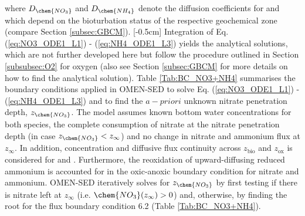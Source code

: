 \documentclass[gmd, manuscript]{copernicus}
\begin{document}
where $D_\chem{NO_3}$ and $D_{\chem{NH_4}}$ denote the diffusion coefficients for  and  which depend on the bioturbation status of the respective geochemical zone (compare Section \ref{subsec:GBCM}). 
[-0.5cm]%
Integration of Eq. (\ref{eq:NO3_ODE1_L1}) - (\ref{eq:NH4_ODE1_L3}) yields the analytical solutions, which are not further developed here but follow the procedure outlined in Section \ref{subsubsec:O2} for oxygen 
(also see Section \ref{subsec:GBCM} for more details on how to find the analytical solution). Table \ref{Tab:BC_NO3+NH4} summarises the boundary conditions applied in OMEN-SED to solve Eq. (\ref{eq:NO3_ODE1_L1}) - (\ref{eq:NH4_ODE1_L3}) 
and to find the $a-priori$ unknown nitrate penetration depth, $z_\chem{NO_3}$. 
The model assumes known bottom water concentrations for both species, the complete consumption of nitrate at the nitrate penetration depth (in case  $z_{\chem{NO_3}} < z_\infty$) and no change in nitrate and ammonium 
flux at $z_\infty$. In addition, concentration and diffusive flux continuity across $z_{\mathrm{bio}}$ and $z_{\mathrm{ox}}$ is considered for  and . 
Furthermore, the reoxidation of upward-diffusing reduced ammonium is accounted for in the oxic-anoxic boundary condition for nitrate and ammonium. 
OMEN-SED iteratively solves for $z_{\chem{NO_3}}$ by first testing if there is nitrate left at $z_\infty$ (i.e. $\chem{NO_3}(z_\infty) > 0$) and, otherwise, by finding the root for the flux 
boundary condition 6.2 (Table \ref{Tab:BC_NO3+NH4}).
\end{document}
